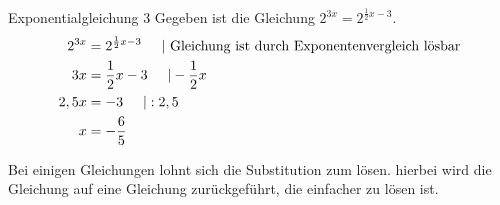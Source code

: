 \begin{bsp}{Exponentialgleichung 3}{}
Gegeben ist die Gleichung $2^{3x} =2^{\frac{1}{2}x-3}$.
\begin{equation*}
    \begin{split}
    2^{3x} &=2^{\frac{1}{2}x-3} \hspace{0.5cm}| \text{ Gleichung ist durch Exponentenvergleich lösbar}\\
    3x&= \frac{1}{2}x-3  \hspace{0.5cm}| - \frac{1}{2}x\\
    2,5x &=-3 \hspace{0.5cm}|:2,5\\
    x&= -\dfrac{6}{5}
    \end{split}
\end{equation*}
\end{bsp}
Bei einigen Gleichungen lohnt sich die Substitution zum lösen. hierbei wird die Gleichung auf eine Gleichung zurückgeführt, die einfacher zu lösen ist.
